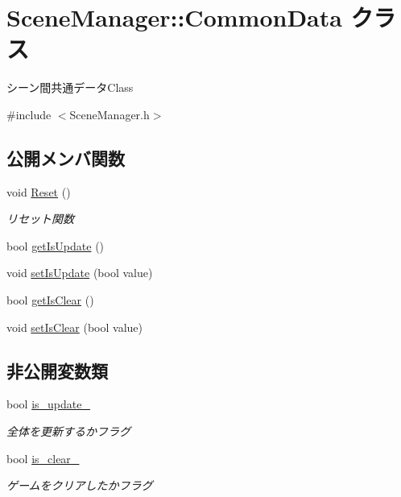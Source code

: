 \hypertarget{class_scene_manager_1_1_common_data}{}\section{Scene\+Manager\+:\+:Common\+Data クラス}
\label{class_scene_manager_1_1_common_data}


シーン間共通データ\+Class  




{\ttfamily \#include $<$Scene\+Manager.\+h$>$}

\subsection*{公開メンバ関数}
\begin{DoxyCompactItemize}
\item 
void \mbox{\hyperlink{class_scene_manager_1_1_common_data_a32823be65c187b909e4159cef57931a9}{Reset}} ()
\begin{DoxyCompactList}\small\item\em リセット関数 \end{DoxyCompactList}\item 
bool \mbox{\hyperlink{class_scene_manager_1_1_common_data_a2e9f26617f0f0ce25b7c2c99fdfadb9c}{get\+Is\+Update}} ()
\item 
void \mbox{\hyperlink{class_scene_manager_1_1_common_data_acff0faeef41334781fc49184ada1a5a4}{set\+Is\+Update}} (bool value)
\item 
bool \mbox{\hyperlink{class_scene_manager_1_1_common_data_a88aa3cc8dd3de9d2e10dc947ca06d397}{get\+Is\+Clear}} ()
\item 
void \mbox{\hyperlink{class_scene_manager_1_1_common_data_a63ed55beac6b37243cafdbec26870fc3}{set\+Is\+Clear}} (bool value)
\end{DoxyCompactItemize}
\subsection*{非公開変数類}
\begin{DoxyCompactItemize}
\item 
bool \mbox{\hyperlink{class_scene_manager_1_1_common_data_a20614bc0af84ec92a4c3a564c0345f9e}{is\+\_\+update\+\_\+}}
\begin{DoxyCompactList}\small\item\em 全体を更新するかフラグ \end{DoxyCompactList}\item 
bool \mbox{\hyperlink{class_scene_manager_1_1_common_data_a467635269880aaf0e5983389cc2ca657}{is\+\_\+clear\+\_\+}}
\begin{DoxyCompactList}\small\item\em ゲームをクリアしたかフラグ \end{DoxyCompactList}\end{DoxyCompactItemize}


